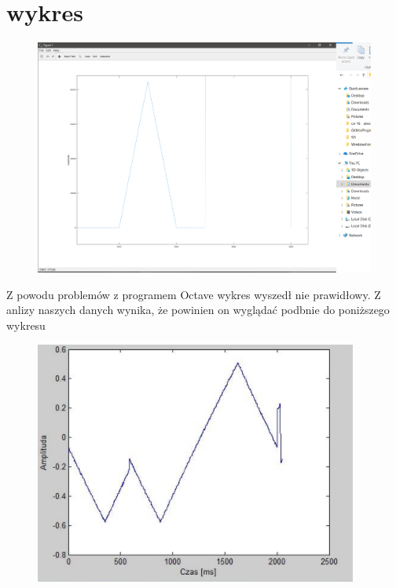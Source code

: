 \documentclass[12pt]{article}
\begin{document}
\section{wykres}
\begin{figure}[!ht]
	\centering 
	\includegraphics{wykres.PNG}
	\caption{}
	\label{}
\end{figure}
Z powodu problemów z programem Octave wykres wyszedł nie prawidłowy. Z anlizy naszych danych wynika, że powinien on wyglądać podbnie do poniższego wykresu
\\
\begin{figure}[!ht]
	\centering 
	\includegraphics{prawidlowy_wykres.PNG}
	\caption{}
	\label{}
\end{figure}
\end{document}
